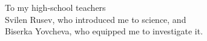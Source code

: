 \thispagestyle{empty}
{}

\vspace*{3cm}

\begin{center}
    To my high-school teachers \\[3pt]
        Svilen Rusev, who introduced me to science, and \\[3pt]
        Biserka Yovcheva, who equipped me to investigate it.



\end{center}

\medskip
